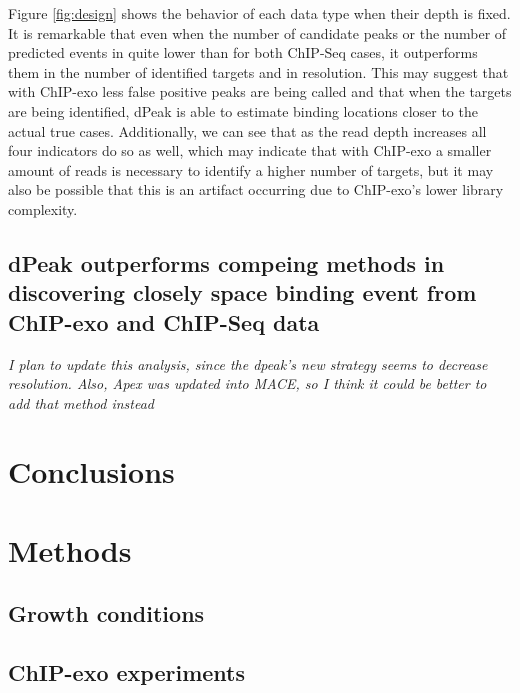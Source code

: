 \documentclass{bmcart}\usepackage[]{graphicx}\usepackage[]{color}
\begin{document}
Figure \ref{fig:design} shows the behavior of each data type when
their depth is fixed. It is remarkable that even when the number of
candidate peaks or the number of predicted events in quite lower than
for both ChIP-Seq cases, it outperforms them in the number of
identified targets and in resolution. This may suggest that with
ChIP-exo less false positive peaks are being called and that when the
targets are being identified, dPeak is able to estimate binding
locations closer to the actual true cases. Additionally, we can see
that as the read depth increases all four indicators do so as well,
which may indicate that with ChIP-exo a smaller amount of reads is
necessary to identify a higher number of targets, but it may also be
possible that this is an artifact occurring due to ChIP-exo's lower
library complexity.

\subsection{dPeak outperforms compeing methods in discovering closely
  space binding event from ChIP-exo and ChIP-Seq data}
\label{sec:dpeak_comp}

\emph{I plan to update this analysis, since the dpeak's new strategy
  seems to decrease resolution. Also, Apex was updated into MACE, so I
  think it could be better to add that method instead}



\section{Conclusions}
\label{sec:conclusions}






\newpage

\section{Methods}
\label{sec:methods}

\color{red}

\subsection{Growth conditions}
\label{sec:growth}


\subsection{ChIP-exo experiments}
\label{sec:experiments}
\end{document}
